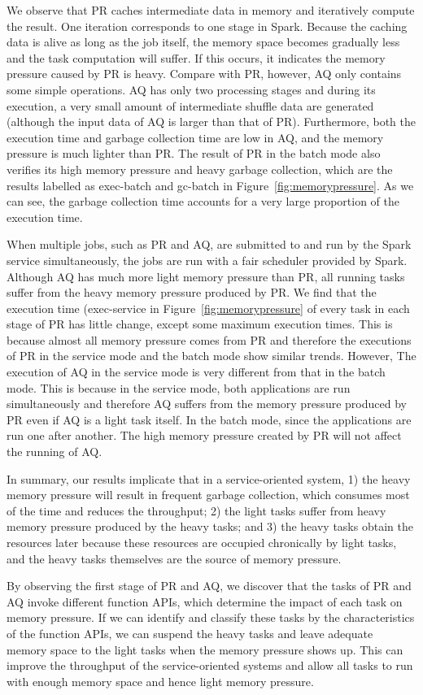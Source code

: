 We observe that PR caches intermediate data in memory and iteratively compute the result. One iteration corresponds to one stage in Spark. Because the caching data is alive as long as the job itself, the memory space becomes gradually less and the task computation will suffer. If this occurs, it indicates the memory pressure caused by PR is heavy. Compare with PR, however, AQ only contains some simple operations. AQ has only two processing stages and during its execution, a very small amount of intermediate shuffle data are generated (although the input data of AQ is larger than that of PR). Furthermore, both the execution time and garbage collection time are low in AQ, and the memory pressure is much lighter than PR. The result of PR in the batch mode also verifies its high memory pressure and heavy garbage collection, which are the results labelled as exec-batch and gc-batch in Figure~\ref{fig:memorypressure}. As we can see, the garbage collection time accounts for a very large proportion of the execution time.

When multiple jobs, such as PR and AQ, are submitted to and run by the Spark service simultaneously, the jobs are run with a fair scheduler provided by Spark. Although AQ has much more light memory pressure  than PR, all running tasks suffer from the heavy memory pressure produced by PR. We find that the execution time (exec-service in Figure~\ref{fig:memorypressure} of every task in each stage of PR has little change, except some maximum execution times. This is because almost all memory pressure comes from PR and therefore the executions of PR in the service mode and the batch mode show similar trends. However, The execution of AQ in the service mode is very different from that in the batch mode. This is because in the service mode, both applications are run simultaneously and therefore AQ suffers from the memory pressure produced by PR even if AQ is a light task itself. In the batch mode, since the applications are run one after another. The high memory pressure created by PR will not affect the running of AQ.

In summary, our results implicate that in a service-oriented system, 1) the heavy memory pressure will result in frequent garbage collection, which consumes most of the time and reduces the throughput; 2) the light tasks suffer from heavy memory pressure produced by the heavy tasks; and 3) the heavy tasks obtain the resources later because these resources are occupied chronically by light tasks, and the heavy tasks themselves are the source of memory pressure.

By observing the first stage of PR and AQ, we discover that the tasks of PR and AQ invoke different function APIs, which determine the impact of each task on memory pressure. If we can identify and classify these tasks by the characteristics of the function APIs, we can suspend the heavy tasks and leave adequate memory space to the light tasks when the memory pressure shows up. This can improve the throughput of the service-oriented systems and allow all tasks to run with enough memory space and hence light memory pressure. 
  
